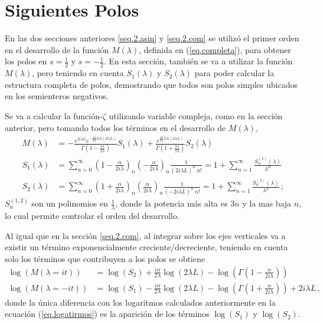 \section{Siguientes Polos}\label{sec.sig.polos}


En las dos secciones anteriores \ref{seq.2.asin} y \ref{seq.2.com}  se utilizó el primer orden en el desarrollo de la función $ M (\lambda )$, definida en (\ref{eq.completa}), para obtener los polos en $s= \frac{1}{2}$ y $s=- \frac{1}{2}$. En esta sección, también se va a utilizar la función $M ( \lambda )$, pero teniendo en cuenta $S _1 ( \lambda ) $ y $S _2 ( \lambda )$ para poder calcular la estructura completa de polos, demostrando que todos son polos simples ubicados en los semienteros negativos. 


Se va a calcular la función-$\zeta$ utilizando variable compleja, como en la sección anterior, pero tomando todos los términos en el desarrollo de $M ( \lambda )$,
\begin{align}
\label{larga}
M( \lambda ) &= 
-
 \frac{e ^{2 i \lambda L } e ^{ - \frac{i \alpha  }{2 \lambda } Ln \left( 2 \lambda L \right) }  }
      { \Gamma \left( 1 - \frac{i \alpha}{2  \lambda}  \right) } S _1 ( \lambda ) +
 \frac{ e ^{   \frac{i \alpha  } {2 \lambda } Ln \left(2 \lambda L \right) } }
      { \Gamma \left( 1 + \frac{i \alpha}{2  \lambda}  \right)   } S _2 ( \lambda )        
\\[10pt]      
	S _1 ( \lambda ) &= \sum _{n=0} ^{ \infty }
\left(1 - \frac{ \alpha}{2 i \lambda}  \right) _n
\left(- \frac{ \alpha}{2 i \lambda}  \right) _n
\frac{1}{( 2 i \lambda L ) ^n \ n!} = 
	1 + \sum _{n=1} ^{\infty} \frac{S ^{(1)} _n (\lambda)}{\lambda ^n} 
\nonumber
\\[10pt]
	S _2 (\lambda ) &= \sum _{n=0 } ^{\infty}
\left( 1 + \frac{ \alpha}{2 i \lambda }  \right) _n
\left( \frac{ \alpha }{2 i \lambda} \right) _n
\frac{1}{( - 2 i \lambda L ) ^n \ n!} = 
1 + \sum _{n=1} ^{\infty} \frac{S ^{(2)} _n (\lambda)}{\lambda ^n}
\nonumber
\, ;
\end{align}
$S _n ^{(1,2)}$ son un polinomios en $\frac{1}{ \lambda}$, donde la potencia más alta es $3 n$ y la mas baja $n$, lo cual permite controlar el orden del desarrollo.


Al igual que en la sección \ref{seq.2.com}, al integrar sobre los ejes verticales va a existir un término exponencialmente creciente/decreciente, teniendo en cuenta solo los términos que contribuyen a los polos se obtiene
\begin{align}
	\log ( M ( \lambda = i t ) ) 
&
	=   \log (S _2) + 
	\frac{i \alpha }{2 \lambda}  \log (2 \lambda L) - 
 	\log \left( \Gamma \left( 1 - \frac{ \alpha}{2 i \lambda} \right) \right) 
\\ 
	\log ( M ( \lambda=-i t ) ) 
&
	=  \log (S _1) -  
	\frac{i \alpha }{2 \lambda}  \log ( 2 \lambda L ) - 
	\log \left( \Gamma \left( 1 + \frac{ \alpha}{2 i \lambda} \right) \right) +
	2 i \lambda L  \nonumber
	\,	,
\end{align}
donde la única diferencia con los logaritmos calculados anteriormente  en la ecuación (\ref{eq.logatirmos}) es la aparición de los términos $\log ( S _1 )$ y $ \log ( S _2) $.

